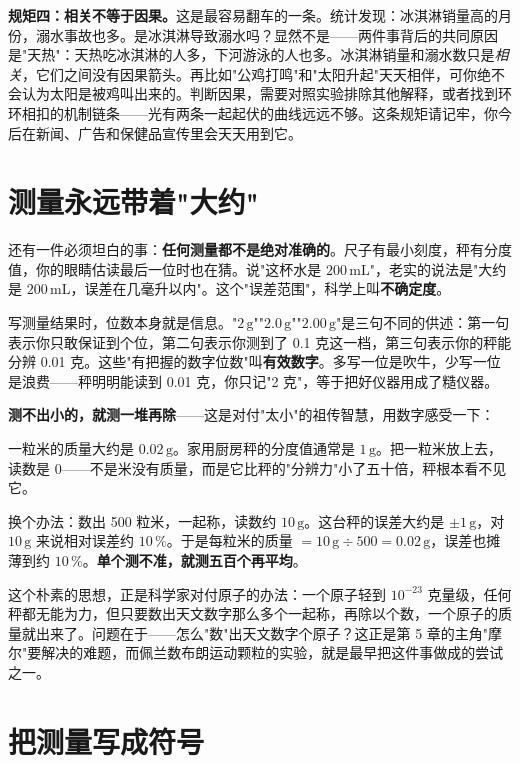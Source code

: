 \textbf{规矩四：相关不等于因果。}这是最容易翻车的一条。统计发现：冰淇淋销量高的月份，溺水事故也多。是冰淇淋导致溺水吗？显然不是——两件事背后的共同原因是"天热"：天热吃冰淇淋的人多，下河游泳的人也多。冰淇淋销量和溺水数只是\emph{相关}，它们之间没有因果箭头。再比如"公鸡打鸣"和"太阳升起"天天相伴，可你绝不会认为太阳是被鸡叫出来的。判断因果，需要对照实验排除其他解释，或者找到环环相扣的机制链条——光有两条一起起伏的曲线远远不够。这条规矩请记牢，你今后在新闻、广告和保健品宣传里会天天用到它。

\section{测量永远带着"大约"}

还有一件必须坦白的事：\textbf{任何测量都不是绝对准确的}。尺子有最小刻度，秤有分度值，你的眼睛估读最后一位时也在猜。说"这杯水是 $200\,\mathrm{mL}$"，老实的说法是"大约是 $200\,\mathrm{mL}$，误差在几毫升以内"。这个"误差范围"，科学上叫\textbf{不确定度}。

写测量结果时，位数本身就是信息。"$2\,\mathrm{g}$""$2.0\,\mathrm{g}$""$2.00\,\mathrm{g}$"是三句不同的供述：第一句表示你只敢保证到个位，第二句表示你测到了 0.1 克这一档，第三句表示你的秤能分辨 0.01 克。这些"有把握的数字位数"叫\textbf{有效数字}。多写一位是吹牛，少写一位是浪费——秤明明能读到 0.01 克，你只记"2 克"，等于把好仪器用成了糙仪器。

\begin{qiaoliang}
\textbf{测不出小的，就测一堆再除}——这是对付"太小"的祖传智慧，用数字感受一下：

一粒米的质量大约是 $0.02\,\mathrm{g}$。家用厨房秤的分度值通常是 $1\,\mathrm{g}$。把一粒米放上去，读数是 $0$——不是米没有质量，而是它比秤的"分辨力"小了五十倍，秤根本看不见它。

换个办法：数出 500 粒米，一起称，读数约 $10\,\mathrm{g}$。这台秤的误差大约是 $\pm 1\,\mathrm{g}$，对 $10\,\mathrm{g}$ 来说相对误差约 $10\,\%$。于是每粒米的质量 $=10\,\mathrm{g}\div 500=0.02\,\mathrm{g}$，误差也摊薄到约 $10\,\%$。\textbf{单个测不准，就测五百个再平均}。

这个朴素的思想，正是科学家对付原子的办法：一个原子轻到 $10^{-23}$ 克量级，任何秤都无能为力，但只要数出天文数字那么多个一起称，再除以个数，一个原子的质量就出来了。问题在于——怎么"数"出天文数字个原子？这正是第 5 章的主角"摩尔"要解决的难题，而佩兰数布朗运动颗粒的实验，就是最早把这件事做成的尝试之一。
\end{qiaoliang}

\section{把测量写成符号}

